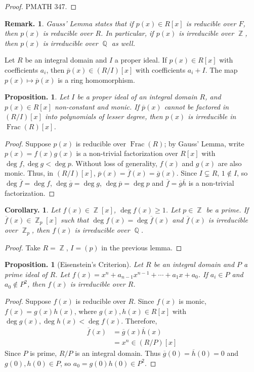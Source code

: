 \documentclass[11pt, a4paper]{memoir}
\DeclareMathOperator{\Q}{{\mathbb{Q}}}
\DeclareMathOperator{\Z}{{\mathbb{Z}}}
\theoremstyle{change}
\newtheorem{corollary}[theorem]{Corollary.}
\newtheorem{proposition}[theorem]{Proposition.}
\theoremstyle{plain}
\theoremstyle{nonumberplain}
\newtheorem{remark}{Remark.}
\newtheorem{proof}{Proof}
\DeclareMathOperator{\Frac}{Frac}
\numberwithin{equation}{section}
\begin{document}
\begin{proof}
    PMATH 347.
\end{proof}
\begin{remark}
    Gauss' Lemma states that if $p(x)\in R[x]$ is reducible over $F$, then $p(x)$ is reducible over $R$.
    In particular, if $p(x)$ is irreducible over $\Z$, then $p(x)$ is irreducible over $\Q$ as well.
\end{remark}
Let $R$ be an integral domain and $I$ a proper ideal.
If $p(x)\in R[x]$ with coefficients $a_i$, then $\overline{p}(x)\in (R/I)[x]$ with coefficients $a_i+I$.
The map $p(x)\mapsto\overline{p}(x)$ is a ring homomorphism.
\begin{proposition}
    Let $I$ be a proper ideal of an integral domain $R$, and $p(x)\in R[x]$ non-constant and monic.
    If $\overline{p}(x)$ cannot be factored in $(R/I)[x]$ into polynomials of lesser degree, then $p(x)$ is irreducible in $\Frac(R)[x]$.
\end{proposition}
\begin{proof}
    Suppose $p(x)$ is reducible over $\Frac(R)$; by Gauss' Lemma, write $p(x)=f(x)g(x)$ is a non-trivial factorization over $R[x]$ with $\deg f,\deg g<\deg p$.
    Without loss of generality, $f(x)$ and $g(x)$ are also monic.
    Thus, in $(R/I)[x]$, $\overline{p}(x)=\overline{f}(x)=\overline{g}(x)$.
    Since $I\subsetneq R$, $1\notin I$, so $\deg\overline{f}=\deg f$, $\deg\overline{g}=\deg g$, $\deg\overline{p}=\deg p$ and $\overline{f}=\overline{g}\overline{h}$ is a non-trivial factorization.
\end{proof}
\begin{corollary}
    Let $f(x)\in\Z[x]$, $\deg f(x)\geq 1$.
    Let $p\in\Z$ be a prime.
    If $\overline{f}(x)\in\Z_p[x]$ such that $\deg f(x)=\deg\overline{f}(x)$ and $\overline{f}(x)$ is irreducible over $\Z_p$, then $f(x)$ is irreducible over $\Q$.
\end{corollary}
\begin{proof}
    Take $R=\Z$, $I=(p)$ in the previous lemma.
\end{proof}
\begin{proposition}[Eisenstein's Criterion]
    Let $R$ be an integral domain and $P$ a prime ideal of $R$.
    Let $f(x)=x^n+a_{n-1}x^{n-1}+\cdots+a_1x+a_0$.
    If $a_i\in P$ and $a_0\notin P^2$, then $f(x)$ is irreducible over $R$.
\end{proposition}
\begin{proof}
    Suppose $f(x)$ is reducible over $R$.
    Since $f(x)$ is monic, $f(x)=g(x)h(x)$, where $g(x),h(x)\in R[x]$ with $\deg g(x),\deg h(x)<\deg f(x)$.
    Therefore,
    \begin{align*}
        \overline{f}(x) &=\overline{g}(x)\overline{h}(x)\\
                        &= x^n\in (R/P)[x]
    \end{align*}
    Since $P$ is prime, $R/P$ is an integral domain.
    Thus $\overline{g}(0)=\overline{h}(0)=0$ and $g(0),h(0)\in P$, so $a_0=g(0)h(0)\in P^2$.
\end{proof}
\end{document}
